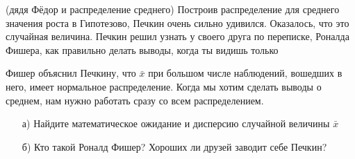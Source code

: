 \documentclass[12pt, a4paper, oneside]{article}
\begin{document}
\begin{problem}{(дядя Фёдор и распределение среднего)}
Построив распределение для среднего значения роста в Гипотезово, Печкин очень сильно удивился. Оказалось, что это случайная величина. Печкин решил узнать у своего друга по переписке, Роналда Фишера, как правильно делать выводы, когда ты видишь только 

Фишер объяснил Печкину, что $\bar x$ при большом числе наблюдений, вошедших в него, имеет нормальное распределение. Когда мы хотим сделать выводы о среднем, нам нужно работать сразу со всем распределением. 

\begin{enumerate}
    \item[а)] Найдите математическое ожидание и дисперсию случайной величины $\bar{x}$
	\item[б)] Кто такой Роналд Фишер? Хороших ли друзей заводит себе Печкин?
\end{enumerate}
\end{problem}
\end{document}
